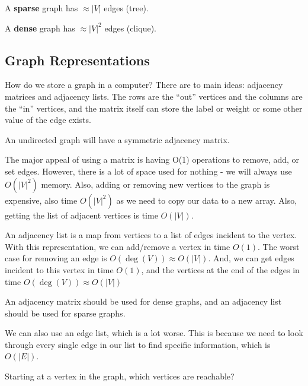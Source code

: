 \documentclass[a4paper]{article}
\begin{document}
\begin{definition}
	A \textbf{sparse} graph has \( \approx |V| \) edges (tree).
\end{definition}

\begin{definition}
	A \textbf{dense} graph has \( \approx |V|^2 \) edges (clique).
\end{definition}


\subsection{Graph Representations}

How do we store a graph in a computer? There are to main ideas: adjacency matrices and adjacency lists. The rows are the ``out'' vertices and the columns are the ``in'' vertices, and the matrix itself can store the label or weight or some other value of the edge exists.

\begin{note}
	An undirected graph will have a symmetric adjacency matrix.
\end{note}

The major appeal of using a matrix is having O(1) operations to remove, add, or set edges. However, there is a lot of space used for nothing - we will always use \( O(|V|^2) \) memory. Also, adding or removing new vertices to the graph is expensive, also time \( O(|V|^2) \) as we need to copy our data to a new array. Also, getting the list of adjacent vertices is time \( O(|V|) \).

An adjacency list is a map from vertices to a list of edges incident to the vertex. With this representation, we can add/remove a vertex in time \( O(1) \). The worst case for removing an edge is \( O(\deg(V)) \approx O(|V|) \). And, we can get edges incident to this vertex in time \( O(1) \), and the vertices at the end of the edges in time \( O(\deg(V)) \approx O(|V|) \)

\begin{note}
	An adjacency matrix should be used for dense graphs, and an adjacency list should be used for sparse graphs.
\end{note}

We can also use an edge list, which is a lot worse. This is because we need to look through every single edge in our list to find specific information, which is \( O(|E|) \).

Starting at a vertex in the graph, which vertices are reachable?
\end{document}

